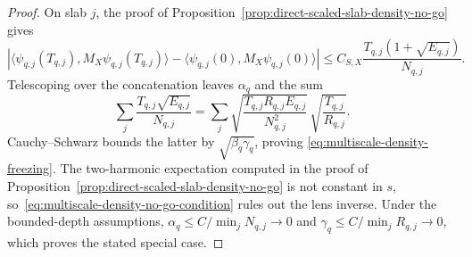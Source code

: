 \documentclass[11pt]{article}
\theoremstyle{remark}
\begin{document}
\begin{proof}
On slab $j$, the proof of
Proposition~\ref{prop:direct-scaled-slab-density-no-go} gives
\[
 \left|
 \langle\psi_{q,j}(T_{q,j}),M_X\psi_{q,j}(T_{q,j})\rangle
 -
 \langle\psi_{q,j}(0),M_X\psi_{q,j}(0)\rangle
 \right|
 \leq
 C_{S,X}\frac{T_{q,j}(1+\sqrt{E_{q,j}})}{N_{q,j}}.
\]
Telescoping over the concatenation leaves $\alpha_q$ and the sum
\[
 \sum_j\frac{T_{q,j}\sqrt{E_{q,j}}}{N_{q,j}}
 =
 \sum_j
 \sqrt{\frac{T_{q,j}R_{q,j}E_{q,j}}{N_{q,j}^2}}\,
 \sqrt{\frac{T_{q,j}}{R_{q,j}}}.
\]
Cauchy--Schwarz bounds the latter by $\sqrt{\beta_q\gamma_q}$, proving
\eqref{eq:multiscale-density-freezing}.  The two-harmonic expectation
computed in the proof of
Proposition~\ref{prop:direct-scaled-slab-density-no-go} is not constant in
$s$, so~\eqref{eq:multiscale-density-no-go-condition} rules out the lens
inverse.  Under the bounded-depth assumptions,
$\alpha_q\leq C/\min_jN_{q,j}\to0$ and
$\gamma_q\leq C/\min_jR_{q,j}\to0$, which proves the stated special case.
\end{proof}
\end{document}
